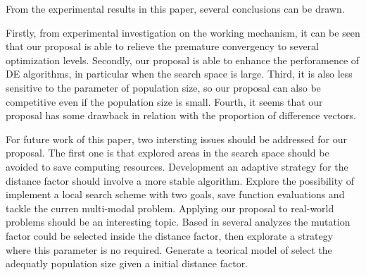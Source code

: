 From the experimental results in this paper, several conclusions can be drawn.
%

Firstly, from experimental investigation on the working mechanism, it can be seen that our proposal is able to relieve the premature convergency to several optimization levels.
%
Secondly, our proposal is able to enhance the perforamence of DE algorithms, in particular when the search space is large.
%
Third, it is also less sensitive to the parameter of population size, so our proposal can also be competitive even if the population size is small.
%
Fourth, it seems that our proposal has some drawback in relation with the proportion of difference vectors.


For future work of this paper, two intersting issues should be addressed for our proposal.
%
The first one is that explored areas in the search space should be avoided to save computing resources.
%
Development an adaptive strategy for the distance factor should involve a more stable algorithm.
%
Explore the possibility of implement a local search scheme with two goals, save function evaluations and tackle the curren multi-modal problem.
%
Applying our proposal to real-world problems should be an interesting topic.
%
Based in several analyzes the mutation factor could be selected inside the distance factor, then explorate a strategy where this parameter is no required.
%
Generate a teorical model of select the adequatly population size given a initial distance factor.
